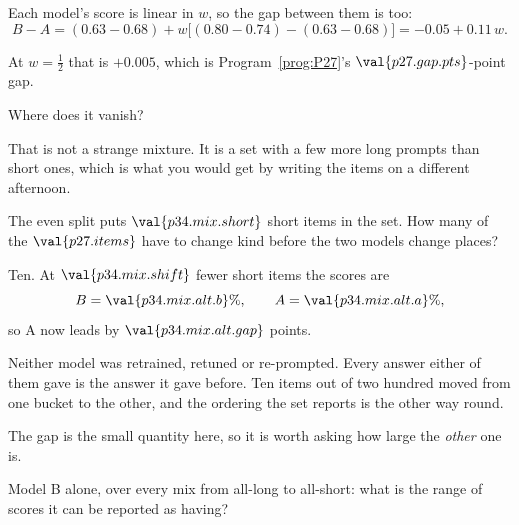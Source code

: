 \begin{fr}

Each model's score is linear in $w$, so the gap between them is too:
\[ B - A = (\num{0.63} - \num{0.68}) + w\bigl[(\num{0.80}-\num{0.74}) -
   (\num{0.63}-\num{0.68})\bigr] = -\num{0.05} + \num{0.11}\,w . \]

At $w = \frac{1}{2}$ that is $+\num{0.005}$, which is
Program~\ref{prog:P27}'s $\val{p27.gap.pts}$-point gap.

Where does it vanish?
\dotline
\nextframe
\end{fr}

\begin{fr}

That is not a strange mixture. It is a set with a few more long prompts than
short ones, which is what you would get by writing the items on a different
afternoon.

The even split puts $\val{p34.mix.short}$ short items in the set. How many of
the $\val{p27.items}$ have to change kind before the two models change
places?
\dotline
\nextframe
\end{fr}

\begin{fr}
\begin{ansblock}
Ten. At $\val{p34.mix.shift}$ fewer short items the scores are
\[ B = \val{p34.mix.alt.b}\% , \qquad A = \val{p34.mix.alt.a}\% , \]
so A now leads by $\val{p34.mix.alt.gap}$ points.
\end{ansblock}

Neither model was retrained, retuned or re-prompted. Every answer either of
them gave is the answer it gave before. Ten items out of two hundred moved
from one bucket to the other, and the ordering the set reports is the
other way round.

\end{fr}

\begin{fr}
The gap is the small quantity here, so it is worth asking how large the
\emph{other} one is.

Model B alone, over every mix from all-long to all-short: what is the range
of scores it can be reported as having?
\dotline
\nextframe
\end{fr}

